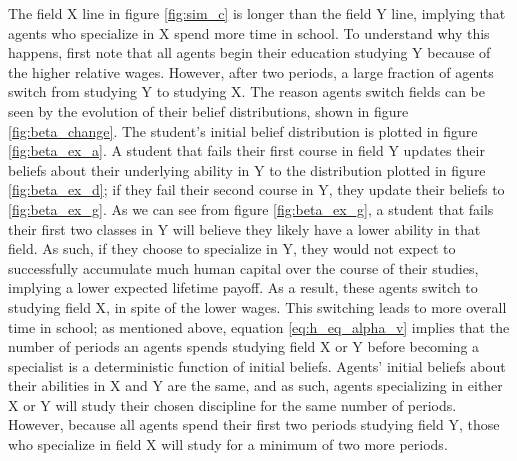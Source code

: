 The field X line in figure \ref{fig:sim_c} is longer than the field Y line, implying that agents who specialize in X spend more time in school.
To understand why this happens, first note that all agents begin their education studying Y because of the higher relative wages. 
However, after two periods, a large fraction of agents switch from studying Y to studying X. 
The reason agents switch fields can be seen by the evolution of their belief distributions, shown in figure \ref{fig:beta_change}.
The student's initial belief distribution is plotted in figure \ref{fig:beta_ex_a}.
A student that fails their first course in field Y updates their beliefs about their underlying ability in Y to the distribution plotted in figure \ref{fig:beta_ex_d}; if they fail their second course in Y, they update their beliefs to \ref{fig:beta_ex_g}.
As we can see from figure \ref{fig:beta_ex_g}, a student that fails their first two classes in Y will believe they likely have a lower ability in that field.
As such, if they choose to specialize in Y, they would not expect to successfully accumulate much human capital over the course of their studies, implying a lower expected lifetime payoff.
As a result, these agents switch to studying field X, in spite of the lower wages.
This switching leads to more overall time in school; as mentioned above, equation \eqref{eq:h_eq_alpha_v} implies that the number of periods an agents spends studying field X or Y before becoming a specialist is a deterministic function of initial beliefs. 
Agents' initial beliefs about their abilities in X and Y are the same, and as such, agents specializing in either X or Y will study their chosen discipline for the same number of periods. 
However, because all agents spend their first two periods studying field Y, those who specialize in field X will study for a minimum of two more periods.

